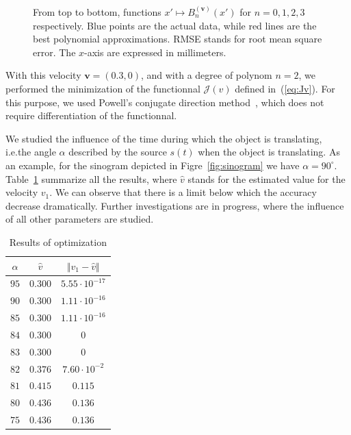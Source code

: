\documentclass[twocolumn]{IEEEtran}
\newcommand{\ie}{i.e.}
\newcommand{\bv}{\mathbf{v}}
\newcommand{\Bnv}{B_n^{(\bv)}}
\begin{document}
\begin{figure}
\begin{tabular}{cc}
	\end{tabular}
	\caption{From top to bottom, functions $x' \mapsto \Bnv(x')$ for $n = 0,1,2,3$ respectively. Blue points are the actual data, while red lines are the best polynomial approximations. RMSE stands for root mean square error. The $x$-axis are expressed in millimeters.\label{fig:Bnx}}
\end{figure}

With this velocity $\bv = (0.3,0)$, and with a degree of polynom $n = 2$, we performed the minimization of the functionnal $\mathcal{J}(v)$ defined in~(\ref{eq:Jv}). For this purpose, we used Powell's conjugate direction method~\cite{powell1964efficient}, which does not require differentiation of the functionnal.

We studied the influence of the time during which the object is translating, \ie the angle $\alpha$ described by the source $s(t)$ when the object is translating. As an example, for the sinogram depicted in Figre~\ref{fig:sinogram} we have $\alpha = 90^{\circ}$. Table~\ref{tab:results} summarize all the results, where $\hat{v}$ stands for the estimated value for the velocity $v_1$. We can observe that there is a limit below which the accuracy decrease dramatically. Further investigations are in progress, where the influence of all other parameters are studied.

\begin{table}[!ht]
\caption{Results of optimization \label{tab:results}}
\centering
	\begin{tabular}{ccc}
	  $\alpha$ & $\hat{v}$ & $\Vert v_1 - \hat{v}\Vert$ \\
	  \hline
		$95$ & $0.30$0 & $5.55 \cdot 10^{-17}$ \\
		$90$ & $0.300$ & $1.11 \cdot 10^{-16}$ \\
		$85$ & $0.300$ & $1.11 \cdot 10^{-16}$ \\
		$84$ & $0.300$ & $0$ \\
		$83$ & $0.300$ & $0$ \\
		$82$ & $0.376$ & $7.60 \cdot 10^{-2}$ \\
		$81$ & $0.415$ & $0.115$ \\
		$80$ & $0.436$ & $0.136$ \\
		$75$ & $0.436$ & $0.136$
\end{tabular}
\end{table}
\end{document}
